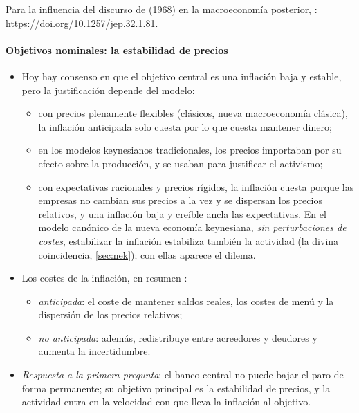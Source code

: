 \documentclass[11pt]{article}
\begin{document}
\begin{anotaciones}
Para la influencia del discurso de  (1968) en la macroeconomía posterior, \textcite{MankiwReis2018Friedman}: \url{https://doi.org/10.1257/jep.32.1.81}.
\end{anotaciones}

\paragraph{Objetivos nominales: la estabilidad de precios}

\begin{itemize}
\item Hoy hay consenso en que el objetivo central es una inflación baja y estable, pero la justificación depende del modelo:
  \begin{itemize}
  \item con precios plenamente flexibles (clásicos, nueva macroeconomía clásica), la inflación anticipada solo cuesta por lo que cuesta mantener dinero;
  \item en los modelos keynesianos tradicionales, los precios importaban por su efecto sobre la producción, y se usaban para justificar el activismo;
  \item con expectativas racionales y precios rígidos, la inflación cuesta porque las empresas no cambian sus precios a la vez y se dispersan los precios relativos, y una inflación baja y creíble ancla las expectativas\nocite{Woodford2003Interest}. En el modelo canónico de la nueva economía keynesiana, \emph{sin perturbaciones de costes}, estabilizar la inflación estabiliza también la actividad (la divina coincidencia, \ref{sec:nek}); con ellas aparece el dilema.
  \end{itemize}
\item Los costes de la inflación, en resumen :
  \begin{itemize}
  \item \emph{anticipada}: el coste de mantener saldos reales, los costes de menú y la dispersión de los precios relativos;
  \item \emph{no anticipada}: además, redistribuye entre acreedores y deudores y aumenta la incertidumbre.
  \end{itemize}
\item \emph{Respuesta a la primera pregunta}: el banco central no puede bajar el paro de forma permanente; su objetivo principal es la estabilidad de precios, y la actividad entra en la velocidad con que lleva la inflación al objetivo.
\end{itemize}
\end{document}
